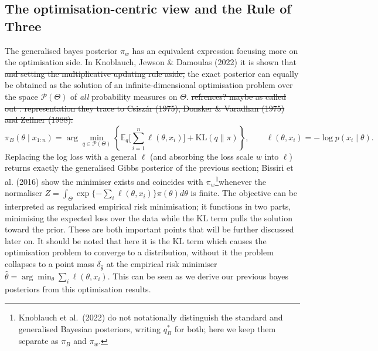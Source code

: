 \documentclass[11pt,a4paper]{article}
\newcommand{\add}[1]{{\color{red}#1}}
\newcommand{\dele}[1]{{\color{gray}\sout{#1}}}
\begin{document}
\subsection*{\add{The optimisation-centric view and the Rule of Three}}
The generalised bayes posterior $\pi_w$ has an equivalent expression focusing more on the optimisation side. In Knoblauch, Jewson \& Damoulas (2022) it is shown that  \dele{and setting the multiplicative updating rule aside,} the exact posterior can equally be obtained as the solution of an infinite-dimensional optimisation problem over the space $\mathcal{P}(\Theta)$ of \emph{all} probability measures on $\Theta$. \dele{ refrences? maybe as called out :  representation they trace to Csisz\'ar (1975), Donsker \& Varadhan (1975) and Zellner (1988):}
$$
    \pi_B(\theta \mid x_{1:n}) = \arg\min_{q \in \mathcal{P}(\Theta)} \left\{ \mathbb{E}_{q}\Big[\sum_{i=1}^{n} \ell(\theta, x_i)\Big] + \mathrm{KL}(q \| \pi) \right\}, \qquad \ell(\theta, x_i) = -\log p(x_i \mid \theta).
$$
Replacing the log loss with a general $\ell$ (and absorbing the loss scale $w$ into $\ell$) returns exactly the generalised Gibbs posterior of the previous section; Bissiri et al. (2016) show the minimiser exists and coincides with $\pi_w$\footnote{Knoblauch et al.\ (2022) do not notationally distinguish the standard and generalised Bayesian posteriors, writing $q^\ast_B$ for both; here we keep them separate as $\pi_B$ and $\pi_w$.}whenever the normaliser $Z = \int_\Theta \exp\{-\sum_i \ell(\theta, x_i)\}\pi(\theta)d\theta$ is finite.
The objective can be interpreted as regularised empirical risk minimisation; it functions in two parts, minimising the expected loss over the data while the $\mathrm{KL}$ term pulls the solution toward the prior. These are both important points that will be further discussed later on.
It should be noted that here it is the $\mathrm{KL}$ term which causes the optimisation problem to converge to a distribution, without it the problem collapses to a point mass $\delta_{\hat\theta}$ at the empirical risk minimiser $\hat\theta = \arg\min_\theta \sum_i \ell(\theta, x_i)$. This can be seen as we derive our previous bayes posteriors from this optimisation results.
\end{document}
